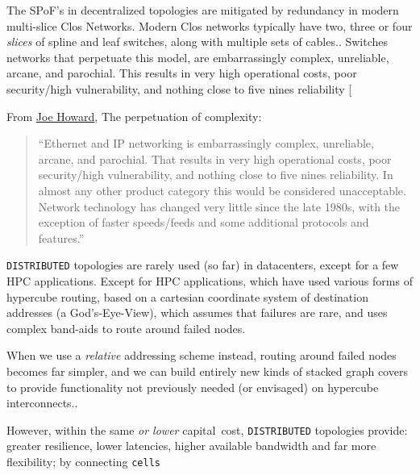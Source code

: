  The SPoF's in decentralized topologies are mitigated by redundancy in modern multi-slice Clos Networks. Modern Clos networks typically have two, three or four \emph{slices} of spline and leaf switches, along with multiple sets of cables..
Switches  networks that perpetuate this model, are embarrassingly complex, unreliable, arcane, and parochial. This results in very high operational costs, poor security/high vulnerability, and nothing close to five nines reliability
 [{From \href{https://www.linkedin.com/pulse/why-network-industry-has-been-stuck-1980s-ciscos-embrace-joe-howard}{Joe Howard}, The perpetuation of complexity:
 
 
\begin{quotation}
\noindent  ``Ethernet and IP networking is embarrassingly complex, unreliable, arcane, and parochial. That results in very high operational costs, poor security/high vulnerability, and nothing close to five nines reliability. In almost any other product category this would be considered unacceptable. Network technology has changed very little since the late 1980s, with the exception of faster speeds/feeds and some additional protocols and features.''
\end{quotation}}

%
\texttt{DISTRIBUTED} topologies are rarely used (so far) in datacenters, except for a few HPC applications. Except for HPC applications, which have used various forms of hypercube routing, based on a cartesian coordinate system of destination addresses (a God's-Eye-View), which assumes that failures are rare, and uses complex band-aids to route around failed nodes. 

When we use a \emph{relative} addressing scheme instead, routing around failed nodes becomes far simpler, and we can build entirely new kinds of stacked graph covers to provide functionality not previously needed (or envisaged) on hypercube interconnects.. 

However, within the same \emph{or lower} capital~cost, \texttt{DISTRIBUTED} topologies provide: greater resilience, lower latencies, higher available bandwidth and far more flexibility; by connecting \texttt{cells}

